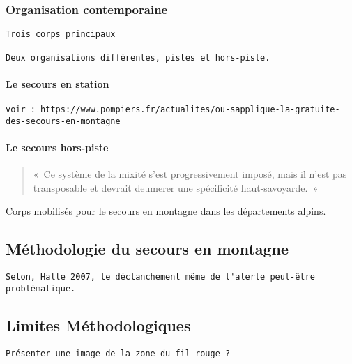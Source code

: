 \subsubsection{Organisation contemporaine}
\label{subsubsec:1-1-1-2}

\begin{verbatim}
Trois corps principaux

Deux organisations différentes, pistes et hors-piste.
\end{verbatim}


\paragraph{Le secours en station}

\begin{verbatim}
voir : https://www.pompiers.fr/actualites/ou-sapplique-la-gratuite-des-secours-en-montagne
\end{verbatim}


\paragraph{Le secours hors-piste}



\begin{quotation}
  «~Ce système de la mixité s'est progressivement imposé, mais il
  n'est pas transposable et devrait deumerer une spécificité
  haut-savoyarde.~»
\end{quotation}

\begin{table}
  \centering
  
  \caption{Corps mobilisés pour le secours en montagne dans les
    départements alpins.}
  \label{tab:organisation_secours_departements}
\end{table}

\subsection{Méthodologie du secours en montagne}
\label{susec:1-1-2}

\begin{verbatim}
Selon, Halle 2007, le déclanchement même de l'alerte peut-être
problématique. 
\end{verbatim}

\subsection{Limites Méthodologiques}
\label{subsec:1-1-3}

\texttt{Présenter une image de la zone du fil rouge ?}
